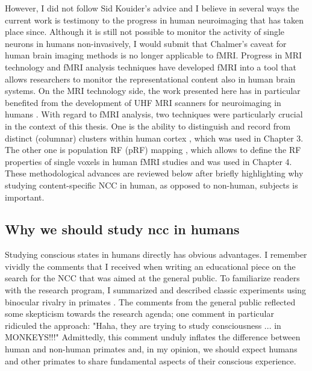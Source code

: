 However, I did not follow Sid Kouider's advice and I believe in several ways the current work is testimony to the progress in human neuroimaging that has taken place since. Although it is still not possible to monitor the activity of single neurons in humans non-invasively, I would submit that Chalmer's caveat for human brain imaging methods is no longer applicable to fMRI. Progress in MRI technology \parencite{Vaughan2001, Duyn2011, Ugurbil2014} and fMRI analysis techniques \parencite{Wandell2015, DeMartino2016, Kashyap2017, Kemper2017, Polimeni2017} have developed fMRI into a tool that allows researchers to monitor the representational content also in human brain systems. On the MRI technology side, the work presented here has in particular benefited from the development of UHF MRI scanners for neuroimaging in humans \parencite{Ugurbil2003}. With regard to fMRI analysis, two techniques were particularly crucial in the context of this thesis. One is the ability to distinguish and record from distinct (columnar) clusters within human cortex \parencite{Cheng2001, Yacoub2007, Yacoub2008}, which was used in Chapter 3. The other one is population RF (pRF) mapping \parencite{Dumoulin2008}, which allows to define the RF properties of single voxels in human fMRI studies and was used in Chapter 4. These methodological advances are reviewed below after briefly highlighting why studying content-specific NCC in human, as opposed to non-human, subjects is important.

\subsection{Why we should study ncc in humans}
Studying conscious states in humans directly has obvious advantages. I remember vividly the comments that I received when writing an educational piece on the search for the NCC that was aimed at the general public. To familiarize readers with the research program, I summarized and described classic experiments using binocular rivalry in primates \parencite{Logothetis1989, Sheinberg1997}. The comments from the general public reflected some skepticism towards the research agenda; one comment in particular ridiculed the approach: "Haha, they are trying to study consciousness ... in MONKEYS!!!" Admittedly, this comment unduly inflates the difference between human and non-human primates and, in my opinion, we should expect humans and other primates to share fundamental aspects of their conscious experience.

